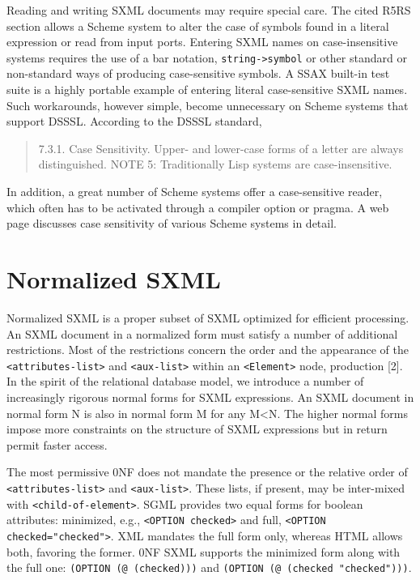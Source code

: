 \documentclass[10pt]{article}
\begin{document}
Reading and writing SXML documents may require special care. The cited R5RS section allows a Scheme system to alter the case of symbols found in a literal expression or read from input ports. Entering SXML names on case-insensitive systems requires the use of a bar notation, \texttt{string->symbol} or
other standard or non-standard ways of producing case-sensitive
symbols. A SSAX built-in test suite is a highly portable example of entering literal case-sensitive SXML names. Such workarounds, however simple, become unnecessary on Scheme systems that support DSSSL. According to the DSSSL standard,\begin{quote}
7.3.1. Case Sensitivity. Upper- and lower-case forms of a
letter are always distinguished. NOTE 5: Traditionally Lisp systems
are case-insensitive.\end{quote}
In addition, a great number of Scheme systems offer a
case-sensitive reader, which often has to be activated through a
compiler option or pragma. A web page \cite{Scheme-case-sensitivity} discusses case sensitivity of various Scheme systems in detail.

\section{Normalized SXML}
Normalized SXML is a proper subset of SXML optimized for
efficient processing. An SXML document in a normalized form must
satisfy a number of additional restrictions. Most of the restrictions
concern the order and the appearance of the \texttt{<attributes-list>} and \texttt{<aux-list>} within an
\texttt{<Element>} node, production [2]. In the spirit of the relational database
model, we introduce a number of increasingly rigorous normal forms for
SXML expressions. An SXML document in normal form N is also in normal
form M for any M<N. The higher normal forms impose more constraints on
the structure of SXML expressions but in return permit faster access.

The most permissive 0NF does not mandate the presence or the relative
order of \texttt{<attributes-list>} and \texttt{<aux-list>}. These lists, if present, may be inter-mixed
with \texttt{<child-of-element>}. SGML provides two equal forms for
boolean attributes: minimized, e.g., \texttt{<OPTION checked>} and
full, \texttt{<OPTION checked="checked">}. XML mandates the full
form only, whereas HTML allows both, favoring the former. 0NF SXML
supports the minimized form along with the full one: \texttt{(OPTION (@ (checked)))} and \texttt{(OPTION (@ (checked "checked")))}.
\end{document}
